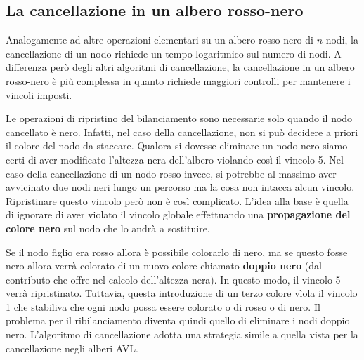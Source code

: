 \subsection{La cancellazione in un albero rosso-nero}
Analogamente ad altre operazioni elementari su un albero rosso-nero di $n$ nodi, la cancellazione di un nodo richiede un tempo logaritmico sul numero di nodi. A differenza però degli altri algoritmi di cancellazione, la cancellazione in un albero rosso-nero è più complessa in quanto richiede maggiori controlli per mantenere i vincoli imposti.



\begin{osservation}
Le operazioni di ripristino del bilanciamento sono necessarie solo quando il nodo cancellato è nero. Infatti, nel caso della cancellazione, non si può decidere a priori il colore del nodo da staccare. Qualora si dovesse eliminare un nodo nero siamo certi di aver modificato l'altezza nera dell'albero violando così il vincolo 5. Nel caso della cancellazione di un nodo rosso invece, si potrebbe al massimo aver avvicinato due nodi neri lungo un percorso ma la cosa non intacca alcun vincolo. Ripristinare questo vincolo però non è così complicato. L'idea alla base è quella di ignorare di aver violato il vincolo globale effettuando una \textbf{propagazione del colore nero} sul nodo che lo andrà a sostituire.
\end{osservation}


Se il nodo figlio era rosso allora è possibile colorarlo di nero, ma se questo fosse nero allora verrà colorato di un nuovo colore chiamato \textbf{doppio nero} (dal contributo che offre nel calcolo dell'altezza nera). In questo modo, il vincolo 5 verrà ripristinato. Tuttavia, questa introduzione di un terzo colore vìola il vincolo 1 che stabiliva che ogni nodo possa essere colorato o di rosso o di nero. Il problema per il ribilanciamento diventa quindi quello di eliminare i nodi doppio nero. L'algoritmo di cancellazione adotta una strategia simile a quella vista per la cancellazione negli alberi AVL.

